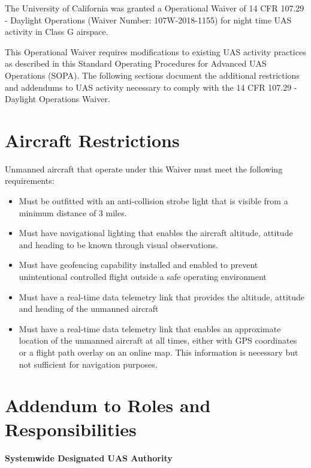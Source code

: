\documentclass[
]{book}
\providecommand{\tightlist}{%
  \setlength{\itemsep}{0pt}\setlength{\parskip}{0pt}}
\begin{document}
The University of California was granted a Operational Waiver of 14 CFR 107.29 - Daylight Operations (Waiver Number: 107W-2018-1155) for night time UAS activity in Class G airspace.

This Operational Waiver requires modifications to existing UAS activity practices as described in this Standard Operating Procedures for Advanced UAS Operations (SOPA). The following sections document the additional restrictions and addendums to UAS activity necessary to comply with the 14 CFR 107.29 - Daylight Operations Waiver.

\hypertarget{s29-ar}{%
\section{Aircraft Restrictions}\label{s29-ar}}

Unmanned aircraft that operate under this Waiver must meet the following requirements:

\begin{itemize}
\tightlist
\item
  Must be outfitted with an anti-collision strobe light that is visible from a minimum distance of 3 miles.
\item
  Must have navigational lighting that enables the aircraft altitude, attitude and heading to be known through visual observations.
\item
  Must have geofencing capability installed and enabled to prevent unintentional controlled flight outside a safe operating environment
\item
  Must have a real-time data telemetry link that provides the altitude, attitude and heading of the unmanned aircraft
\item
  Must have a real-time data telemetry link that enables an approximate location of the unmanned aircraft at all times, either with GPS coordinates or a flight path overlay on an online map. This information is necessary but not sufficient for navigation purposes.
\end{itemize}

\hypertarget{s29-rr}{%
\section{Addendum to Roles and Responsibilities}\label{s29-rr}}

\textbf{Systemwide Designated UAS Authority}
\end{document}
